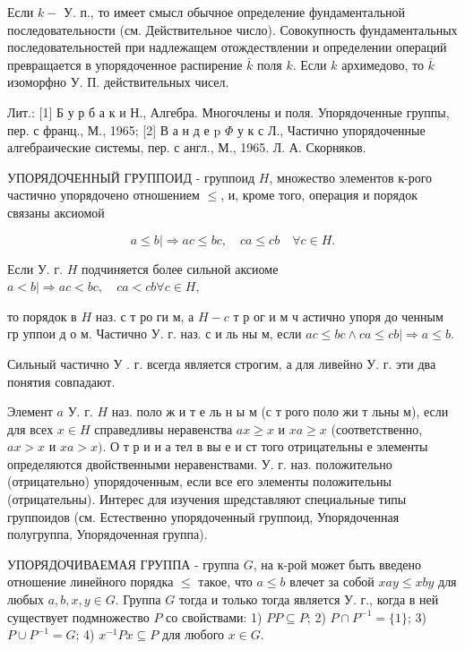 \documentclass[10pt]{article}
\begin{document}
Если $k-$ У. п., то имеет смысл обычное определение фундаментальной последовательности (см. Действительное число). Совокупность фундаментальных последовательностей при надлежащем отождествлении и определении операций превращается в упорядоченное распирение $\bar{k}$ поля $k$. Если $k$ архимедово, то $\bar{k}$ изоморфно У. П. действительных чисел.



Лит.: [1] Б у р б а к и Н., Алгебра. Многочлены и поля. Упорядоченные группы, пер. с франц., М., 1965; [2] В а н д е p $\Phi$ у к с Л., Частично упорядоченные алгебраические системы, пер. с англ., М., 1965. Л. А. Скорняков.



УПОРЯДОЧЕННЫЙ ГРУППОИД - группоид $H$, множество элементов к-рого частично упорядочено отношением $\leqslant$, и, кроме того, операция и порядок связаны аксиомой



\[

a \leqslant b \mid \Rightarrow a c \leqslant b c, \quad c a \leqslant c b \quad \forall c \in H .

\]



Если У. г. $H$ подчиняется более сильной аксиоме $a<b \mid \Rightarrow a c<b c, \quad c a<c b \forall c \in H$,



то порядок в $H$ наз. с т ро ги м, а $H-c$ т р ог и м ч астично упоря до ченным гр уппои д о м. Частично У. г. наз. с и ль ны м, если $a c \leqslant b c \wedge c a \leqslant c b \mid \Rightarrow a \leqslant b$.



Сильный частично У . г. всегда является строгим, а для ливейно У. г. эти два понятия совпадают.



Элемент $a$ У. г. $H$ наз. поло ж и т е ль н ы м (с т рого поло жи т льны м), если для всех $x \in H$ справедливы неравенства $a x \geqslant x$ и $x a \geqslant x$ (соответственно, $a x>x$ и $x a>x)$. О т р и и а тел в вы е и ст того отрицательны е элементы определяются двойственными неравенствами. У. г. наз. положительно (отрицательно) упорядоченным, если все его элементы положительны (отрицательны). Интерес для изучения шредставляют специальные типы группоидов (см. Естественно упорядоченный группоид, Упорядоченная полугруппа, Упорядоченная группа).



УПОРЯДОЧИВАЕМАЯ ГРУППА - группа $G$, на к-рой может быть введено отношение линейного порядка $\leqslant$ такое, что $a \leqslant b$ влечет за собой $x a y \leqslant x b y$ для любых $a, b, x, y \in G$. Группа $G$ тогда и только тогда является У. г., когда в ней существует подмножество $P$ со свойствами: 1) $P P \subseteq P$; 2) $P \cap P^{-1}=\{1\}$; 3) $P \cup P^{-1}=G$; 4) $x^{-1} P x \subseteq P$ для любого $x \in G$.
\end{document}
